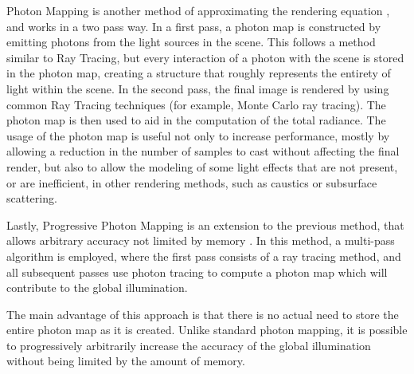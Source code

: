 Photon Mapping is another method of approximating the rendering equation \cite{jensen1996global}, and works in a two pass way.
In a first pass, a photon map is constructed by emitting photons from the light sources in the scene. This follows a method similar to Ray Tracing, but every interaction of a photon with the scene is stored in the photon map, creating a structure that roughly represents the entirety of light within the scene.
In the second pass, the final image is rendered by using common Ray Tracing techniques (for example, Monte Carlo ray tracing). The photon map is then used to aid in the computation of the total radiance.
The usage of the photon map is useful not only to increase performance, mostly by allowing a reduction in the number of samples to cast without affecting the final render, but also to allow the modeling of some light effects that are not present, or are inefficient, in other rendering methods, such as caustics or subsurface scattering.

Lastly, Progressive Photon Mapping is an extension to the previous method, that allows arbitrary accuracy not limited by memory \cite{hachisuka2008progressive}. In this method, a multi-pass algorithm is employed, where the first pass consists of a ray tracing method, and all subsequent passes use photon tracing to compute a photon map which will contribute to the global illumination.

The main advantage of this approach is that there is no actual need to store the entire photon map as it is created. Unlike standard photon mapping, it is possible to progressively arbitrarily increase the accuracy of the global illumination without being limited by the amount of memory.

